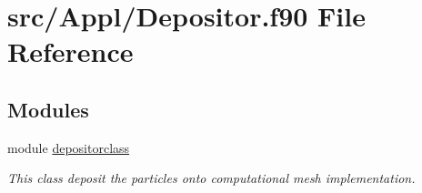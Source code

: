 \hypertarget{_depositor_8f90}{}\section{src/\+Appl/\+Depositor.f90 File Reference}
\label{_depositor_8f90}
\subsection*{Modules}
\begin{DoxyCompactItemize}
\item 
module \mbox{\hyperlink{namespacedepositorclass}{depositorclass}}
\begin{DoxyCompactList}\small\item\em This class deposit the particles onto computational mesh implementation. \end{DoxyCompactList}\end{DoxyCompactItemize}
